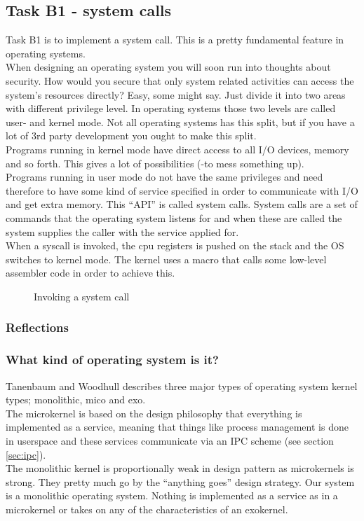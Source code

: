 


\subsection{Task B1 - system calls}
Task B1 is to implement a system call. This is a pretty fundamental feature in operating systems.\\

When designing an operating system you will soon run into thoughts about security. How would you secure that only system related activities
can access the system's resources directly? Easy, some might say. Just divide it into two areas with different privilege level. 
In operating systems those two levels are called user- and kernel mode. Not all operating systems has this split, but if you have a
 lot of 3rd party development you ought to make this split.\\
Programs running in kernel mode have direct access to all I/O devices, memory and so forth. This gives a lot of possibilities (-to mess something up).\\
Programs running in user mode do not have the same privileges and need therefore to have some kind of service specified in order to communicate with I/O and get extra memory. This ``API'' is called system calls. System calls are a set of commands that the operating system listens for and when these are called the system supplies the caller with the service applied for.\\
When a syscall is invoked, the cpu registers is pushed on the stack and the OS switches to kernel mode. The kernel uses a macro that calls some low-level assembler code in order to achieve this.


\begin{figure}
\centering
{}
\caption{Invoking a system call}
\label{fig:kernel_mode}
\end{figure}

\subsubsection{Reflections}

\subsubsection*{What kind of operating system is it?}
Tanenbaum and Woodhull describes three major types of operating system kernel types; monolithic, mico and exo.\\
The microkernel is based on the design philosophy that everything is implemented as a service, meaning that things like process management is done
in userspace and these services communicate via an IPC scheme (see section \ref{sec:ipc}).\\
The monolithic kernel is proportionally weak in design pattern as microkernels is strong. They pretty much go by the ``anything goes'' design 
strategy. Our system is a monolithic operating system. Nothing is implemented as a service as in a microkernel or takes on any of the
characteristics of an exokernel.

